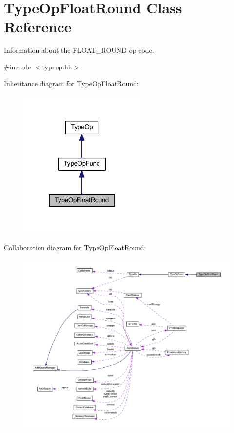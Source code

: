 \hypertarget{class_type_op_float_round}{}\section{Type\+Op\+Float\+Round Class Reference}
\label{class_type_op_float_round}


Information about the F\+L\+O\+A\+T\+\_\+\+R\+O\+U\+ND op-\/code.  




{\ttfamily \#include $<$typeop.\+hh$>$}



Inheritance diagram for Type\+Op\+Float\+Round\+:
\nopagebreak
\begin{figure}[H]
\begin{center}
\leavevmode
\includegraphics[width=180pt]{class_type_op_float_round__inherit__graph}
\end{center}
\end{figure}


Collaboration diagram for Type\+Op\+Float\+Round\+:
\nopagebreak
\begin{figure}[H]
\begin{center}
\leavevmode
\includegraphics[width=350pt]{class_type_op_float_round__coll__graph}
\end{center}
\end{figure}
